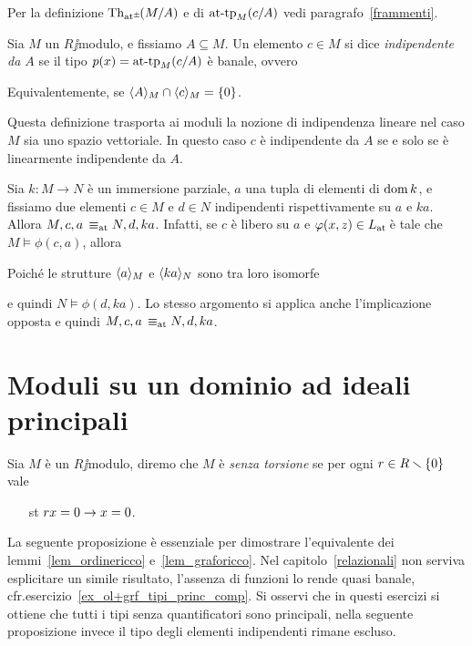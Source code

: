 Per la definizione $\textrm{Th}_{{\tiny\rm at^\pm}}\hskip-.3ex(M/A)$ e di $\textrm{at\mbox{-}tp}_M(c/A)$ vedi paragrafo~\ref{frammenti}.

\begin{definition} Sia $M$ un $R\jj$modulo, e fissiamo $A\subseteq M$. Un elemento $c\in M$ si dice \emph{indipendente da $A$\/} se il tipo $p(x)=\textrm{at\mbox{-}tp}_M(c/A)$ \`e banale, ovvero


Equivalentemente, se $\langle A\rangle_M\cap\langle c\rangle_M=\{0\}$.\QED
\end{definition}  

Questa definizione trasporta ai moduli la nozione di indipendenza lineare nel caso $M$ sia uno spazio vettoriale. In questo caso $c$ \`e indipendente da $A$ se e solo se \`e linearmente indipendente da $A$.

\begin{remark}\label{oss_liberi_qf}
Sia $k:M\to N$ \`e un immersione parziale, $a$ una tupla di elementi di $\mathop{\rm dom} k$, e fissiamo due elementi $c\in M$ e $d\in N$ indipendenti rispettivamente su $a$ e $ka$. Allora $M,c,a\,\equiv_{\rm at}N,d,ka$. Infatti, se $c$ \`e libero su $a$ e $\varphi(x,z)\in L_{\tiny\rm at}\hskip-.3ex$ \`e tale che $M\models\phi(c,a)$, allora 


Poich\'e le strutture $\langle a\rangle_M$ e  $\langle ka\rangle_N$ sono tra loro isomorfe 


e quindi $N\models\phi(d,ka)$. Lo stesso argomento si applica anche l'implicazione opposta e quindi $M,c,a\,\equiv_{\rm at}N,d,ka$.\QED 
\end{remark}

\section{Moduli su un dominio ad ideali principali}

Sia $M$ \`e un $R\jj$modulo, diremo che $M$ \`e \emph{senza torsione\/} se per ogni  $r\in R\smallsetminus \{0\}$ vale
\begin{itemize}
\item[st] $rx= 0\rightarrow x=0$.
\end{itemize}

La seguente proposizione \`e essenziale per dimostrare l'equivalente dei lemmi~\ref{lem_ordinericco} e~\ref{lem_graforicco}. Nel capitolo~\ref{relazionali} non serviva esplicitare un simile risultato, l'assenza di funzioni lo rende quasi banale, cfr.\@  esercizio~\ref{ex_ol+grf_tipi_princ_comp}. Si osservi che in questi esercizi si ottiene che tutti i tipi senza quantificatori sono principali, nella seguente proposizione invece il tipo degli elementi indipendenti rimane escluso.

